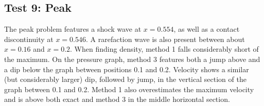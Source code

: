 \documentclass[10pt]{article}
\begin{document}
\clearpage

\subsection{Test 9: Peak}
The peak problem features a shock wave at $x=0.554$, as well as a contact discontinuity at $x=0.546$. A rarefaction wave is also present between about $x=0.16$ and $x=0.2$. When finding density, method 1 falls considerably short of the maximum. On the pressure graph, method 3 features both a jump above and a dip below the graph between positions 0.1 and 0.2. Velocity shows a similar (but considerably larger) dip, followed by jump, in the vertical section of the graph between 0.1 and 0.2. Method 1 also overestimates the maximum velocity and is above both exact and method 3 in the middle horizontal section. 
\end{document}

